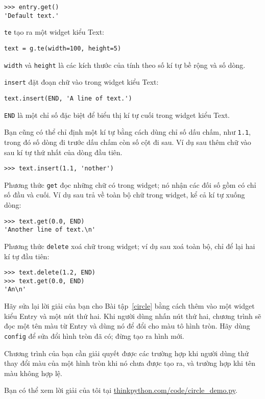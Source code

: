 \documentclass[11pt]{book}
\begin{document}
\beforeverb
\begin{verbatim}
>>> entry.get()
'Default text.'
\end{verbatim}
\afterverb
%
{\tt te} tạo ra một widget kiểu Text:

\beforeverb
\begin{verbatim}
text = g.te(width=100, height=5)
\end{verbatim}
\afterverb
%
{\tt width} và {\tt height} là các kích thước của
tính theo số kí tự bề rộng và số dòng.

{\tt insert} đặt đoạn chữ vào trong widget kiểu Text:

\beforeverb
\begin{verbatim}
text.insert(END, 'A line of text.')
\end{verbatim}
\afterverb
%
{\tt END} là một chỉ số đặc biệt để biểu thị kí tự cuối trong widget kiểu
Text.

Bạn cũng có thể chỉ định một kí tự bằng cách dùng chỉ số dấu chấm, như {\tt 1.1},
trong đó số dòng đi trước dấu chấm còn số cột đi sau.
Ví dụ sau thêm chữ vào sau kí tự thứ nhất của dòng đầu tiên.

\beforeverb
\begin{verbatim}
>>> text.insert(1.1, 'nother')
\end{verbatim}
\afterverb
%
Phương thức {\tt get} đọc những chữ có trong widget; nó nhận các đối số
gồm có chỉ số đầu và cuối. Ví dụ sau trả về toàn bộ chữ trong widget, kể cả
kí tự xuống dòng:

\beforeverb
\begin{verbatim}
>>> text.get(0.0, END)
'Another line of text.\n'
\end{verbatim}
\afterverb
%
Phương thức {\tt delete} xoá chữ trong widget;
ví dụ sau xoá toàn bộ, chỉ để lại hai kí tự đầu tiên:

\beforeverb
\begin{verbatim}
>>> text.delete(1.2, END)
>>> text.get(0.0, END)
'An\n'
\end{verbatim}
\afterverb
%

\begin{ex}
\label{circle2}

Hãy sửa lại lời giải của bạn cho Bài tập~\ref{circle} bằng cách thêm vào
một widget kiểu Entry và một nút thứ hai. Khi người dùng nhấn nút thứ hai,
chương trình sẽ đọc một tên màu từ Entry và dùng nó để đổi cho
màu tô hình tròn. Hãy dùng {\tt config}
để sửa đổi hình tròn đã có; đừng tạo ra hình mới.

Chương trình của bạn cần giải quyết được các trường hợp khi người dùng thử
thay đổi màu của một hình tròn khi nó chưa được tạo ra, và trường hợp khi
tên màu không hợp lệ.

Bạn có thể xem lời giải của tôi tại \url{thinkpython.com/code/circle_demo.py}.

\end{ex}
\end{document}
